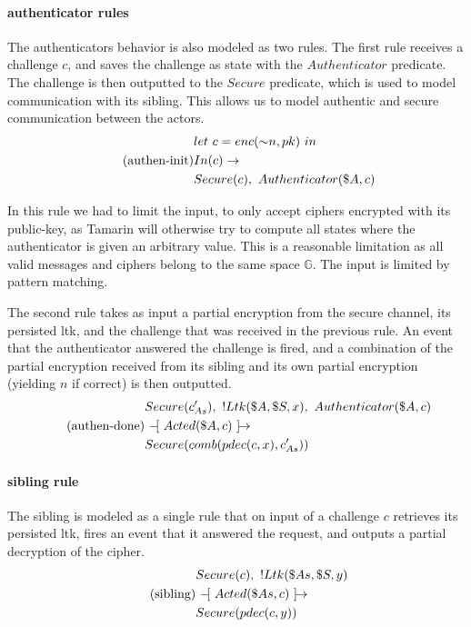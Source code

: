 \paragraph{\gls{authenticator} rules}
The \glspl{authenticator} behavior is also modeled as two rules. The first rule receives a challenge $c$, and saves the challenge as state with the $Authenticator$ predicate. The challenge is then outputted to the $Secure$ predicate, which is used to model communication with its \gls{sibling}. This allows us to model authentic and secure communication between the actors.
\begin{equation} \tag{authen-init}
\begin{split}
& \plet{c = enc({\sim}n, pk)} \\
& In(c) \ifarrow \\
& Secure(c),~Authenticator(\$A,c)
\end{split}
\end{equation}

In this rule we had to limit the input, to only accept ciphers encrypted with its public-key, as Tamarin will otherwise try to compute all states where the \gls{authenticator} is given an arbitrary value. This is a reasonable limitation as all valid messages and ciphers belong to the same space $\mathbb{G}$. The input is limited by pattern matching.

The second rule takes as input a partial encryption from the secure channel, its persisted ltk, and the challenge that was received in the previous rule. An event that the \gls{authenticator} answered the challenge is fired, and a combination of the partial encryption received from its \gls{sibling} and its own partial encryption (yielding $n$ if correct) is then outputted. 
\begin{equation} \tag{authen-done}
\begin{split}
& Secure(c'_{As}),~!Ltk(\$A, \$S, x),~Authenticator(\$A,c) \\
& \ifarrow[ Acted(\$A, c) ] \\
& Secure(comb(pdec(c,x), c'_{As}))
\end{split}
\end{equation}

\paragraph{\gls{sibling} rule}
The sibling is modeled as a single rule that on input of a challenge $c$ retrieves its persisted ltk, fires an event that it answered the request, and outputs a partial decryption of the cipher.
\begin{equation} \tag{sibling}
\begin{split}
& Secure(c),~!Ltk(\$As, \$S, y) \\
& \ifarrow[ Acted(\$As, c) ] \\
& Secure(pdec(c,y))
\end{split}
\end{equation}

